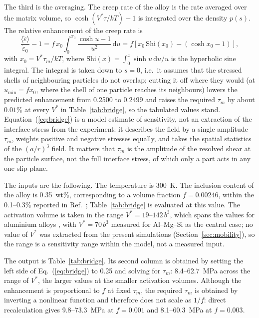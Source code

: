 The third is the averaging. The creep rate of the alloy is the rate averaged
over the matrix volume, so $\cosh(V^{*}\tau/kT)-1$ is integrated over the
density $p(s)$. The relative enhancement of the creep rate is
\begin{equation}
\frac{\langle\dot\varepsilon\rangle}{\dot\varepsilon_0}-1
 = f\,x_0\!\int_{0}^{x_0}\!\frac{\cosh u-1}{u^{2}}\,\mathrm{d}u
 = f\left[x_0\,\mathrm{Shi}(x_0)-(\cosh x_0-1)\right],
\label{eq:bridge}
\end{equation}
with $x_0=V^{*}\tau_m/kT$, where
$\mathrm{Shi}(x)=\int_0^x\sinh u\,\mathrm{d}u/u$ is the hyperbolic sine
integral. The integral is taken down to $s=0$, i.e.\ it assumes that the
stressed shells of neighbouring particles do not overlap; cutting it off where
they would (at $u_{\min}=f x_0$, where the shell of one particle reaches its
neighbours) lowers the predicted enhancement from 0.2500 to 0.2499 and raises
the required $\tau_m$ by about $0.01\%$ at every $V^{*}$ in
Table~\ref{tab:bridge}, so the tabulated values stand.
Equation~(\ref{eq:bridge}) is a model estimate of sensitivity, not an
extraction of the interface stress from the experiment: it describes the field
by a single amplitude $\tau_m$, weights positive and negative stresses
equally, and takes the spatial statistics of the $(a/r)^{3}$ field. It
matters that $\tau_m$ is the amplitude of the resolved shear at the particle
surface, not the full interface stress, of which only a part acts in any one
slip plane.

The inputs are the following. The temperature is 300~K. The inclusion content of the alloy is
0.35~wt\%, corresponding to a volume fraction $f=0.00246$, within the
0.1--0.3\% reported in Ref.~\cite{Friha2024JMMM}; Table~\ref{tab:bridge} is
evaluated at this value.
The activation volume is taken in the range $V^{*}=19$--$142\,b^{3}$, which
spans the values for aluminium alloys \cite{CaillardMartin2003}, with
$V^{*}=70\,b^{3}$ measured for Al--Mg--Si \cite{Soula2022JALCOM} as the
central case; no value of $V^{*}$ was extracted from the present simulations
(Section~\ref{sec:mobility}), so the range is a sensitivity range within the
model, not a measured input.

The output is Table~\ref{tab:bridge}. Its second column is obtained by
setting the left side of Eq.~(\ref{eq:bridge}) to 0.25 and solving for
$\tau_m$: 8.4--62.7~MPa across the range of $V^{*}$, the larger values at the
smaller activation volumes. Although the enhancement is proportional to $f$
at fixed $\tau_m$, the required $\tau_m$ is obtained by inverting a nonlinear
function and therefore does not scale as $1/f$: direct recalculation gives
9.8--73.3~MPa at $f=0.001$ and 8.1--60.3~MPa at $f=0.003$.

